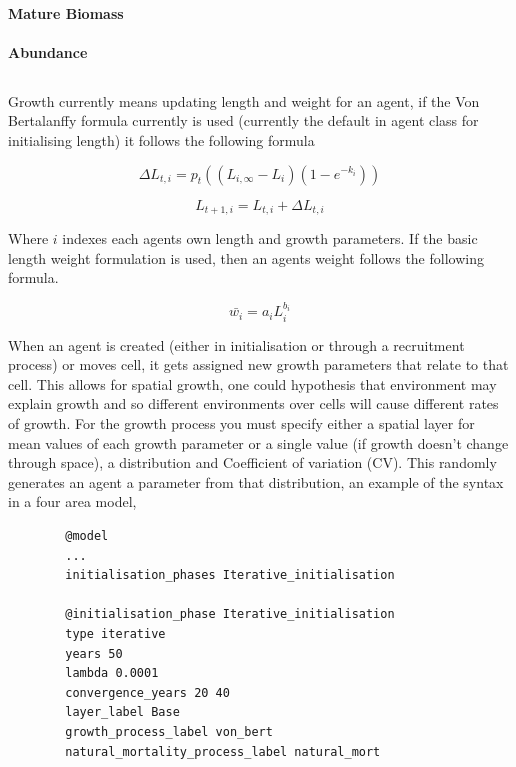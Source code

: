 \paragraph*{Mature Biomass}\label{para:mature_biomass}

\paragraph*{Abundance}\label{para:abundance}

\subsection{\label{sec:age-at-age}}
Growth currently means updating length and weight for an agent, if the Von Bertalanffy formula currently is used (currently the default in agent class for initialising length) it follows the following formula

\begin{equation}\label{VB}
	\Delta L_{t,i} = p_t((L_{i,\infty} - L_i)(1 - e^{-k_i}))
\end{equation}

\begin{equation}\label{actual_growth}
L_{t+1,i} = L_{t,i} + \Delta L_{t,i}
\end{equation}

Where $i$ indexes each agents own length and growth parameters. If the basic length weight formulation is used, then an agents weight follows the following formula.

\begin{equation}\label{mean_weight}
\bar{w_i} = a_iL_i^{b_i}
\end{equation}


When an agent is created (either in initialisation or through a recruitment process) or moves cell, it gets assigned new growth parameters that relate to that cell. This allows for spatial growth, one could hypothesis that environment may explain growth and so different environments over cells will cause different rates of growth. For the growth process you must specify either a spatial layer for mean values of each growth parameter or a single value (if growth doesn't change through space), a distribution and Coefficient of variation (CV). This randomly generates an agent a parameter from that distribution, an example of the syntax in a four area model,

{\small{\begin{verbatim}
		@model
		...
		initialisation_phases Iterative_initialisation
		
		@initialisation_phase Iterative_initialisation
		type iterative
		years 50
		lambda 0.0001
		convergence_years 20 40
		layer_label Base
		growth_process_label von_bert
		natural_mortality_process_label natural_mort
\end{verbatim}}}

